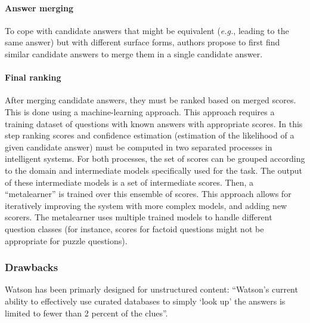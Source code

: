 \documentclass[10pt,journal,letterpaper,compsoc]{IEEEtran}
\begin{document}
\paragraph{Answer merging}
To cope with candidate answers that might be equivalent ({\it e.g.}, leading to
the same answer) but with different surface forms, authors propose to first find
similar candidate answers to merge them in a single candidate answer. 

\paragraph{Final ranking}
After merging candidate answers, they must be ranked based on merged scores.
This is done using a machine-learning approach. This approach requires a
training dataset of questions with known answers with appropriate scores. 
In this step ranking scores and confidence estimation (estimation of the
likelihood of a given candidate answer) must be computed in two separated
processes in intelligent systems. 
For both processes, the set of scores can be grouped according to the domain and
intermediate models specifically used for the task. The output of these
intermediate models is a set of intermediate scores.
Then, a ``metalearner'' is trained over this ensemble of scores.
This approach allows for iteratively improving the system with more complex
models, and adding new scorers. 
The metalearner uses multiple trained models to handle different question
classes (for instance, scores for factoid questions might not be appropriate
for puzzle questions). 


\subsubsection{Drawbacks}
{\sc Watson} has been primarly designed for unstructured content: ``Watson's
current ability to effectively use curated databases to simply `look up' the
answers is limited to fewer than 2 percent of the clues''. 




\end{document}
